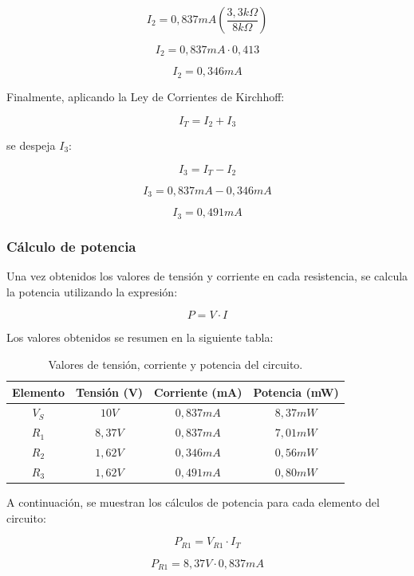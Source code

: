 \documentclass[a4paper,12pt]{article}
\begin{document}
	\[
	I_2 =
	0,837mA
	\left(
	\frac{3,3k\Omega}{8k\Omega}
	\right)
	\]
	
	\[
	I_2 =
	0,837mA \cdot 0,413
	\]
	
	\[
	I_2 = 0,346mA
	\]
	
	Finalmente, aplicando la Ley de Corrientes de Kirchhoff:
	
	\[
	I_T = I_2 + I_3
	\]
	
	se despeja $I_3$:
	
	\[
	I_3 = I_T - I_2
	\]
	
	\[
	I_3 = 0,837mA - 0,346mA
	\]
	
	\[
	I_3 = 0,491mA
	\]
	
	
	
	
	
	\subsubsection*{Cálculo de potencia}
	
	Una vez obtenidos los valores de tensión y corriente en cada resistencia, se calcula la potencia
	utilizando la expresión:
	
	\[
	P = V \cdot I
	\]
	
	Los valores obtenidos se resumen en la siguiente tabla:
	
	\begin{table}[H]
		\centering
		\begin{tabular}{|c|c|c|c|}
			\hline
			\textbf{Elemento} & \textbf{Tensión (V)} & \textbf{Corriente (mA)} & \textbf{Potencia (mW)} \\
			\hline
			$V_S$ & $10V$ & $0,837mA$ & $8,37mW$ \\
			\hline
			$R_1$ & $8,37V$ & $0,837mA$ & $7,01mW$ \\
			\hline
			$R_2$ & $1,62V$ & $0,346mA$ & $0,56mW$ \\
			\hline
			$R_3$ & $1,62V$ & $0,491mA$ & $0,80mW$ \\
			\hline
		\end{tabular}
		\caption{Valores de tensión, corriente y potencia del circuito.}
		\label{tab:valores_potencia}
	\end{table}
	
	A continuación, se muestran los cálculos de potencia para cada elemento del circuito:
	
	\[
	P_{R1} = V_{R1} \cdot I_T
	\]
	
	\[
	P_{R1} = 8,37V \cdot 0,837mA
	\]
	
\end{document}
